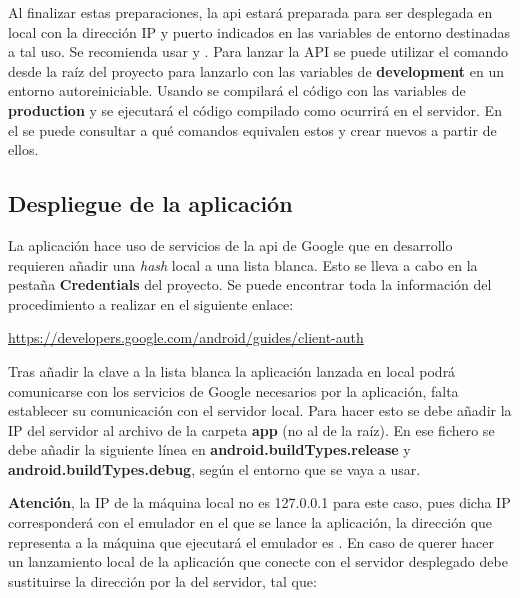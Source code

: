 Al finalizar estas preparaciones, la \acrshort{api} estará preparada para ser desplegada en local con la dirección IP y puerto indicados en las variables de entorno destinadas a tal uso. Se recomienda usar  y . Para lanzar la API se puede utilizar el comando  desde la raíz del proyecto para lanzarlo con las variables de \textbf{development} en un entorno autoreiniciable. Usando  se compilará el código con las variables de \textbf{production} y se ejecutará el código compilado como ocurrirá en el servidor. En el  se puede consultar a qué comandos equivalen estos y crear nuevos a partir de ellos.

\subsection{Despliegue de la aplicación}

La aplicación hace uso de servicios de la \acrshort{api} de Google que en desarrollo requieren añadir una \emph{hash} local a una lista blanca. Esto se lleva a cabo en la pestaña \textbf{Credentials} del proyecto. Se puede encontrar toda la información del procedimiento a realizar en el siguiente enlace:

\href{https://developers.google.com/android/guides/client-auth}{https://developers.google.com/android/guides/client-auth}

Tras añadir la clave a la lista blanca la aplicación lanzada en local podrá comunicarse con los servicios de Google necesarios por la aplicación, falta establecer su comunicación con el servidor local. Para hacer esto se debe añadir la IP del servidor al archivo  de la carpeta \textbf{app} (no al de la raíz). En ese fichero se debe añadir la siguiente línea en \textbf{android.buildTypes.release} y \textbf{android.buildTypes.debug}, según el entorno que se vaya a usar.


\textbf{Atención}, la IP de la máquina local no es 127.0.0.1 para este caso, pues dicha IP corresponderá con el emulador en el que se lance la aplicación, la dirección que representa a la máquina que ejecutará el emulador es . En caso de querer hacer un lanzamiento local de la aplicación que conecte con el servidor desplegado debe sustituirse la dirección por la del servidor, tal que:

